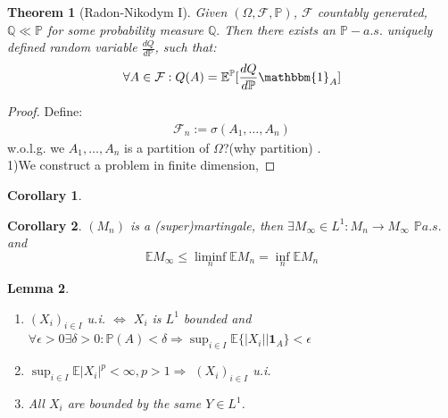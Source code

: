 \documentclass[a4paper,11pt]{book}
\newtheorem{theorem}{Theorem}[section]
\newtheorem{corollary}{Corollary}[theorem]
\newtheorem{lemma}[theorem]{Lemma}
\theoremstyle{definition}
\theoremstyle{remark}
\begin{document}
\begin{theorem}[Radon-Nikodym I]
	Given $(\Omega, \mathcal{F}, \mathbb{P})$, $\mathcal{F}$ countably generated, $\mathbb{Q} \ll \mathbb{P}$ for some probability measure $\mathbb{Q}.$ Then there exists an $\mathbb{P}-a.s.$ uniquely defined random variable $\frac{dQ}{d\mathbb{P}}$, such that:
	\begin{align*}
		\forall A \in \mathcal{F}: Q(A) = \mathbb{E}^\mathbb{P}[\frac{dQ}{d\mathbb{P}} \mathbbm{1}_{A}]
	\end{align*}
\end{theorem}
\begin{proof}
	Define:
	\begin{align*}
		\mathcal{F}_n:= \sigma(A_1, \dots, A_n)
	\end{align*}
	w.o.l.g. we $A_1, \dots, A_n$ is a partition of $\Omega$?(why partition) \label{Q:partition}.\\
	1)We construct a problem in finite dimension, 
\end{proof}

\begin{corollary}
	
\end{corollary}











 
\begin{corollary}
 	$(M_n)$ is a (super)martingale, then $\exists M_\infty \in L^1: M_n \rightarrow M_\infty$ $\mathbb{P} a.s.$ and 
 	\begin{equation*}
 		\mathbb{E}M_\infty \leq \liminf_n \mathbb{E} M_n = \inf_n \mathbb{E} M_n
 	\end{equation*}
 \end{corollary}
 

 
 \begin{lemma} \quad
 	\begin{enumerate}
 		\item $(X_i)_{i \in I}$ u.i. $\Leftrightarrow$ $X_i$ is $L^1$ bounded and $\forall \epsilon > 0 \exists \delta > 0: \mathbb{P}(A) < \delta \Rightarrow \sup_{i \in I}\mathbb{E}\{|X_i|| \textbf{1}_A\} < \epsilon$
 		\item $\sup_{i \in I}\mathbb{E} |X_i|^p < \infty, p > 1 \Rightarrow$ $(X_i)_{i \in I}$ u.i.  
 		\item All $X_i$ are bounded by the same $Y \in L^1$.
 	\end{enumerate}
 \end{lemma}
 
\end{document}
